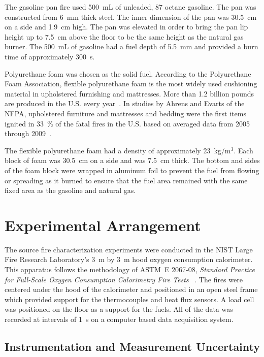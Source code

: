 \documentclass[twoside]{uocthesis}
\begin{document}
{The gasoline pan fire used 500~mL of unleaded, 87 octane gasoline.  The pan was constructed from 6~mm thick steel.  The inner dimension of the pan was 30.5~cm on a side and 1.9~cm high.  The pan was elevated in order to bring the pan lip height up to 7.5~cm above the floor to be the same height as the natural gas burner.  The 500~mL of gasoline had a fuel depth of 5.5~mm and provided a burn time of approximately 300~s.

Polyurethane foam was chosen as the solid fuel. According to the Polyurethane Foam Association, flexible polyurethane foam is the most widely used cushioning material in upholstered furnishing and mattresses. More than 1.2 billion pounds are produced in the U.S. every year~\cite{Foam,Polyurethane_Foam}. In studies by Ahrens and Evarts of the NFPA, upholstered furniture and mattresses and bedding were the first items ignited in 33~\% of the fatal fires in the U.S. based on averaged data from 2005 through 2009~\cite{Ahrens:2011,Evarts:2011}.

The flexible polyurethane foam had a density of approximately 23~kg/m$^3$.  Each block of foam was 30.5~cm on a side and was 7.5~cm thick. The bottom and sides of the foam block were wrapped in aluminum foil to prevent the fuel from flowing or spreading as it burned to ensure that the fuel area remained with the same fixed area as the gasoline and natural gas.

\section{Experimental Arrangement}

The source fire characterization experiments were conducted in the NIST Large Fire Research Laboratory's 3~m by 3~m hood oxygen consumption calorimeter. This apparatus follows the methodology of ASTM~E 2067-08, {\em Standard Practice for Full-Scale Oxygen Consumption Calorimetry Fire Tests} ~\cite{ASTM_E2067}. The fires were centered under the hood of the calorimeter and positioned in an open steel frame which provided support for the thermocouples and heat flux sensors. A load cell was positioned on the floor as a support for the fuels.  All of the data was recorded at intervals of 1~s on a computer based data acquisition system.

\subsection{Instrumentation and Measurement Uncertainty}

}
\end{document}
